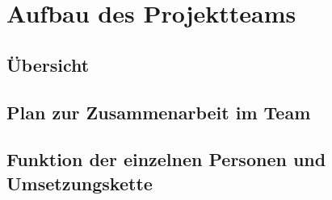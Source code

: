\chapter{Aufbau des Projektteams}

\section{Übersicht}

\section{Plan zur Zusammenarbeit im Team}

\section{Funktion der einzelnen Personen und Umsetzungskette}